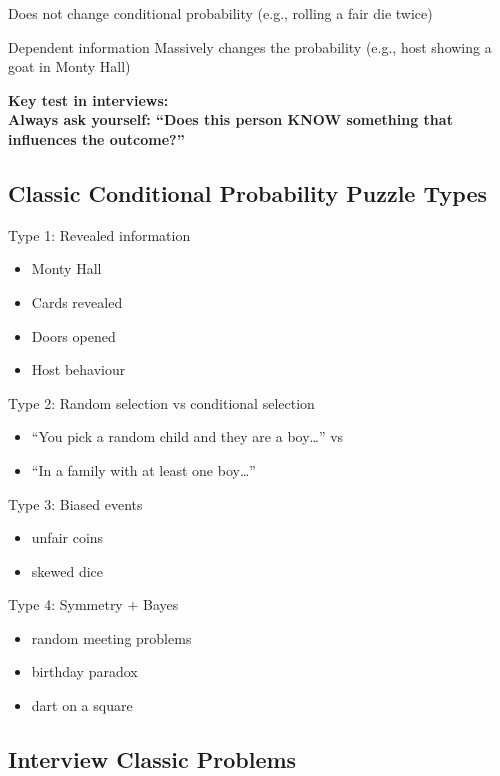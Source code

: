 \documentclass{report}
\begin{document}
Does not change conditional probability
(e.g., rolling a fair die twice)

Dependent information
Massively changes the probability
(e.g., host showing a goat in Monty Hall)

\textbf{Key test in interviews: \\
Always ask yourself: “Does this person KNOW something that influences the outcome?”}

\subsection*{Classic Conditional Probability Puzzle Types}

Type 1: Revealed information
\begin{itemize}
    \item Monty Hall
    \item Cards revealed
    \item Doors opened
    \item Host behaviour
\end{itemize}

Type 2: Random selection vs conditional selection
\begin{itemize}
    \item “You pick a random child and they are a boy…”
vs
    \item “In a family with at least one boy…”
\end{itemize}

Type 3: Biased events
\begin{itemize}
    \item unfair coins
    \item skewed dice
\end{itemize}

Type 4: Symmetry + Bayes
\begin{itemize}
    \item random meeting problems
    \item birthday paradox
    \item dart on a square
\end{itemize}






\subsection*{Interview Classic Problems}
\end{document}
